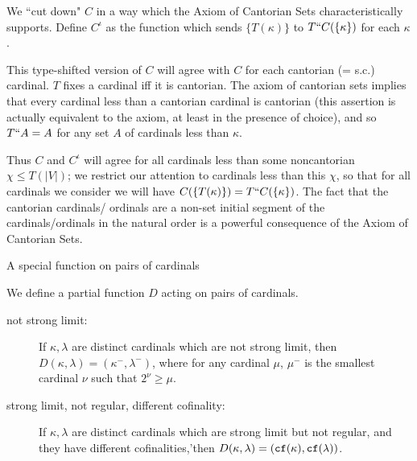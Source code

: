 \documentclass{slides}
\begin{document}
\begin{slide}

We ``cut down" $C$ in a way which the Axiom of Cantorian Sets characteristically supports.  Define $C^{\iota}$ as the function which sends $\{T(\kappa)\}$ to
$T``C(\{\kappa\})$ for each $\kappa$.

This type-shifted version of $C$ will agree with $C$ for each cantorian (= s.c.) cardinal.  $T$ fixes a cardinal iff it is cantorian.  The axiom of cantorian sets implies
that every cardinal less than a cantorian cardinal is cantorian (this assertion is actually equivalent to the axiom, at least in the presence of choice), and so $T``A=A$ for any set $A$ of cardinals less than $\kappa$.

Thus $C$ and $C^{\iota}$ will agree for all cardinals less than some noncantorian $\chi \leq T(|V|)$;  we restrict our attention to cardinals less than this $\chi$, so that for all
cardinals we consider we will have $C(\{T(\kappa)\}) = T``C(\{\kappa\})$.  The fact that the cantorian cardinals/ ordinals are a non-set initial segment of the cardinals/ordinals in the natural order is a powerful consequence of the Axiom of Cantorian Sets.


\end{slide}

\begin{slide}

{\Large A special function on pairs of cardinals}

We define a partial function $D$ acting on pairs of cardinals.

\begin{description}

\item[not strong limit:]  If $\kappa,\lambda$ are distinct cardinals which are not strong limit, then $D(\kappa,\lambda) = (\kappa^-,\lambda^-)$, where for any cardinal $\mu$, $\mu^-$ is the smallest cardinal $\nu$ such that $2^{\nu}\geq \mu$.

\item[strong limit, not regular, different cofinality:]  If $\kappa,\lambda$ are distinct cardinals which are strong limit but not regular, and they have different cofinalities,'then $D(\kappa,\lambda)=({\tt cf}(\kappa),{\tt cf}(\lambda))$.

\end{description}

\end{slide}
\end{document}
